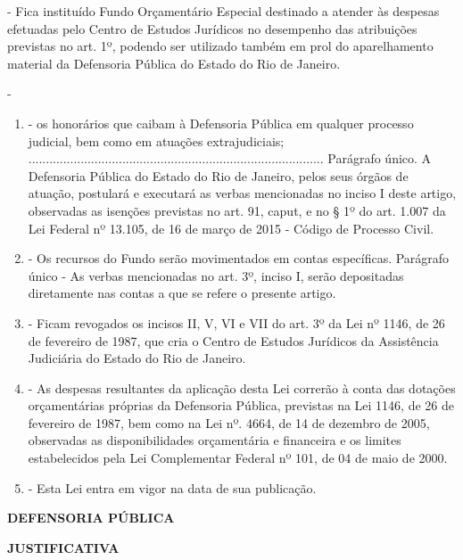 \documentclass[10pt]{article}
\begin{document}
\item - Fica instituído Fundo Orçamentário Especial destinado a atender às despesas efetuadas pelo Centro de Estudos Jurídicos no desempenho das atribuições previstas no art. 1º, podendo ser utilizado também em prol do aparelhamento material da Defensoria Pública do Estado do Rio de Janeiro.

\item - 
\begin{enumerate}[label=\Roman*]
\item - os honorários que caibam à Defensoria Pública em qualquer processo judicial, bem como em atuações extrajudiciais;
.....................................................................................
Parágrafo único. A Defensoria Pública do Estado do Rio de Janeiro, pelos seus órgãos de atuação, postulará e executará as verbas mencionadas no inciso I deste artigo, observadas as isenções previstas no art. 91, caput, e no § 1º do art. 1.007 da Lei Federal nº 13.105, de 16 de março de 2015 - Código de Processo Civil.

\item - Os recursos do Fundo serão movimentados em contas específicas.
Parágrafo único - As verbas mencionadas no art. 3º, inciso I, serão depositadas diretamente nas contas a que se refere o presente artigo.


\item - Ficam revogados os incisos II, V, VI e VII do art. 3º da Lei nº 1146, de 26 de fevereiro de 1987, que cria o Centro de Estudos Jurídicos da Assistência Judiciária do Estado do Rio de Janeiro.

\item - As despesas resultantes da aplicação desta Lei correrão à conta das dotações orçamentárias próprias da Defensoria Pública, previstas na Lei 1146, de 26 de fevereiro de 1987, bem como na Lei nº. 4664, de 14 de dezembro de 2005, observadas as disponibilidades orçamentária e financeira e os limites estabelecidos pela Lei Complementar Federal nº 101, de 04 de maio de 2000.

\item - Esta Lei entra em vigor na data de sua publicação. 



\end{enumerate}




\begin{center}
  

   \bigskip

  \textbf{  DEFENSORIA PÚBLICA}

  \bigskip

  \textbf{JUSTIFICATIVA}
  \bigskip

\end{center}
\end{document}
